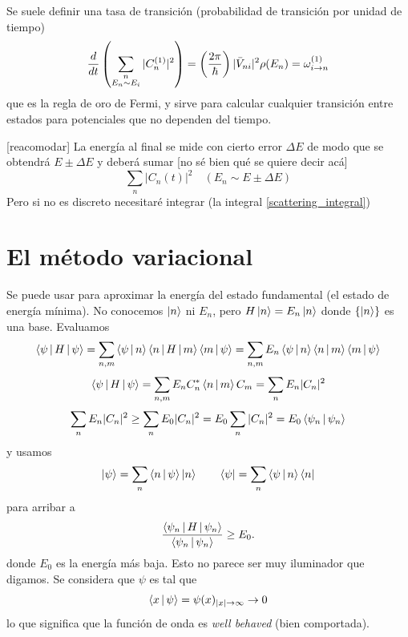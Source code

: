 \documentclass[10pt,oneside]{CBFT_book}
\begin{document}
Se suele definir una tasa de transición (probabilidad de transición por unidad de tiempo)
\[
	\frac{d^{\hspace{-0.05em}} {}}{d {t}^{\hspace{-0.05em}}}\left( \sum_{\substack{n \\ E_n\sim E_i}} |C_n^{(1)}|^2 \right) =
	\left(\frac{2\pi}{\hbar}\right)	|\bar{V}_{ni}|^2 \rho(E_n) = \omega_{i\to n}^{(1)}
\]
que es la regla de oro de Fermi, y sirve para calcular cualquier transición entre estados
para potenciales que no dependen del tiempo.

[reacomodar]
La energía al final se mide con cierto error $\Delta E$ de modo que se obtendrá $E \pm \Delta E$ y 
deberá sumar [no sé bien qué se quiere decir acá]
\[
	\sum_n | C_n(t) |^2 \quad (E_n \sim E \pm \Delta E)
\]
Pero si no es discreto necesitaré integrar (la integral \eqref{scattering_integral})

\section{El método variacional}

Se puede usar para aproximar la energía del estado fundamental (el estado de energía mínima).
No conocemos $\Ket{n}$ ni $E_n$, pero $ H \Ket{n} = E_n \Ket{n}$ donde $\{ \Ket{n} \}$ es
una base.
Evaluamos
\[
	\Braket{\psi|H|\psi} = \sum_{n,m}\Braket{\psi|n}\Braket{n|H|m}\Braket{m|\psi} =
		\sum_{n,m} E_n \Braket{\psi|n}\Braket{n|m}\Braket{m|\psi} 
\]
\[
	\Braket{\psi|H|\psi} = \sum_{n,m} E_n C_n^*\Braket{n|m}C_m = \sum_{n} E_n|C_n|^2
\]
\[
	\sum_{n} E_n|C_n|^2 \geq \sum_n E_0|C_n|^2 = E_0 \sum_n |C_n|^2 = E_0 \Braket{\psi_n|\psi_n}
\]
y usamos 
\[
\Ket{\psi} = \sum_n \Braket{n|\psi}\Ket{n} \qquad \Bra{\psi} = \sum_n \Braket{\psi|n}\Bra{n} 
\]
para arribar a
\[
	\frac{\Braket{\psi_n|H|\psi_n}}{\Braket{\psi_n|\psi_n}} \geq E_0.
\]
donde $E_0$ es la energía más baja. Esto no parece ser muy iluminador que digamos.
Se considera que $\psi$ es tal que 
\[
	\Braket{x|\psi} = \psi(x)_{|x|\to\infty} \to 0
\]
lo que significa que la función de onda es {\it well behaved} (bien comportada).
\end{document}
